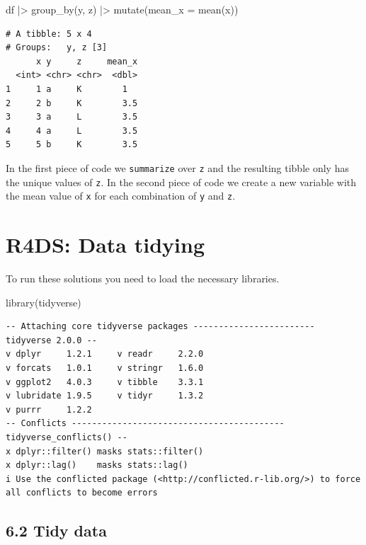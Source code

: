 \documentclass[
  letterpaper,
  DIV=11,
  numbers=noendperiod]{scrreprt}
\newenvironment{Shaded}{\begin{snugshade}}{\end{snugshade}}
\newcommand{\AttributeTok}[1]{\textcolor[rgb]{0.40,0.45,0.13}{#1}}
\newcommand{\FunctionTok}[1]{\textcolor[rgb]{0.28,0.35,0.67}{#1}}
\newcommand{\NormalTok}[1]{\textcolor[rgb]{0.00,0.23,0.31}{#1}}
\newcommand{\SpecialCharTok}[1]{\textcolor[rgb]{0.37,0.37,0.37}{#1}}
\begin{document}
\begin{Shaded}
\begin{Highlighting}[]
\NormalTok{df }\SpecialCharTok{|\textgreater{}}
  \FunctionTok{group\_by}\NormalTok{(y, z) }\SpecialCharTok{|\textgreater{}}
  \FunctionTok{mutate}\NormalTok{(}\AttributeTok{mean\_x =} \FunctionTok{mean}\NormalTok{(x))}
\end{Highlighting}
\end{Shaded}

\begin{verbatim}
# A tibble: 5 x 4
# Groups:   y, z [3]
      x y     z     mean_x
  <int> <chr> <chr>  <dbl>
1     1 a     K        1  
2     2 b     K        3.5
3     3 a     L        3.5
4     4 a     L        3.5
5     5 b     K        3.5
\end{verbatim}

In the first piece of code we \texttt{summarize} over \texttt{z} and the
resulting tibble only has the unique values of \texttt{z}. In the second
piece of code we create a new variable with the mean value of \texttt{x}
for each combination of \texttt{y} and \texttt{z}.

\chapter{R4DS: Data tidying}\label{r4ds-data-tidying}

To run these solutions you need to load the necessary libraries.

\begin{Shaded}
\begin{Highlighting}[]
\FunctionTok{library}\NormalTok{(tidyverse)}
\end{Highlighting}
\end{Shaded}

\begin{verbatim}
-- Attaching core tidyverse packages ------------------------ tidyverse 2.0.0 --
v dplyr     1.2.1     v readr     2.2.0
v forcats   1.0.1     v stringr   1.6.0
v ggplot2   4.0.3     v tibble    3.3.1
v lubridate 1.9.5     v tidyr     1.3.2
v purrr     1.2.2     
-- Conflicts ------------------------------------------ tidyverse_conflicts() --
x dplyr::filter() masks stats::filter()
x dplyr::lag()    masks stats::lag()
i Use the conflicted package (<http://conflicted.r-lib.org/>) to force all conflicts to become errors
\end{verbatim}

\section{6.2 Tidy data}\label{tidy-data}
\end{document}
